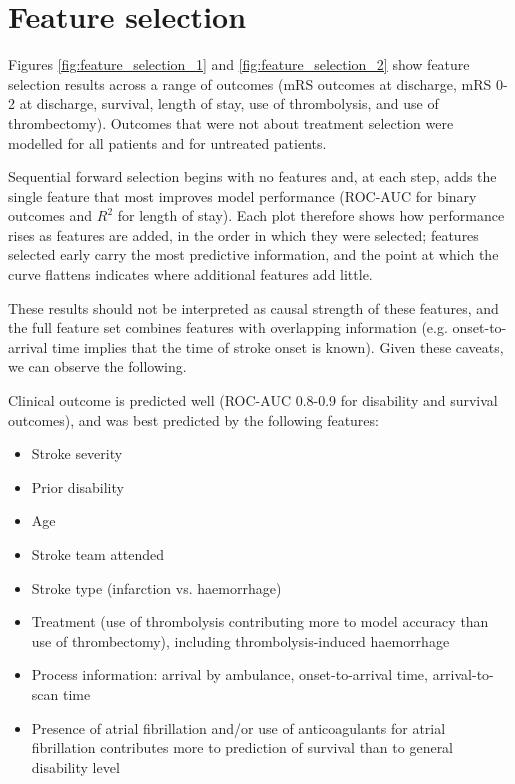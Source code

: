
\newpage

\section{Feature selection}\label{sec:supp_featsel}

Figures \ref{fig:feature_selection_1} and \ref{fig:feature_selection_2} show feature selection results across a range of outcomes (mRS outcomes at discharge, mRS 0-2 at discharge, survival, length of stay, use of thrombolysis, and use of thrombectomy). Outcomes that were not about treatment selection were modelled for all patients and for untreated patients.

Sequential forward selection begins with no features and, at each step, adds the single feature that most improves model performance (ROC-AUC for binary outcomes and $R^2$ for length of stay). Each plot therefore shows how performance rises as features are added, in the order in which they were selected; features selected early carry the most predictive information, and the point at which the curve flattens indicates where additional features add little. 

These results should not be interpreted as causal strength of these features, and the full feature set combines features with overlapping information (e.g. onset-to-arrival time implies that the time of stroke onset is known). Given these caveats, we can observe the following.

Clinical outcome is predicted well (ROC-AUC 0.8-0.9 for disability and survival outcomes), and was best predicted by the following features:

\begin{itemize}
    \item Stroke severity
    \item Prior disability
    \item Age
    \item Stroke team attended
    \item Stroke type (infarction vs. haemorrhage)
    \item Treatment (use of thrombolysis contributing more to model accuracy than use of thrombectomy), including thrombolysis-induced haemorrhage
    \item Process information: arrival by ambulance, onset-to-arrival time, arrival-to-scan time
    \item Presence of atrial fibrillation and/or use of anticoagulants for atrial fibrillation contributes more to prediction of survival than to general disability level
\end{itemize}

